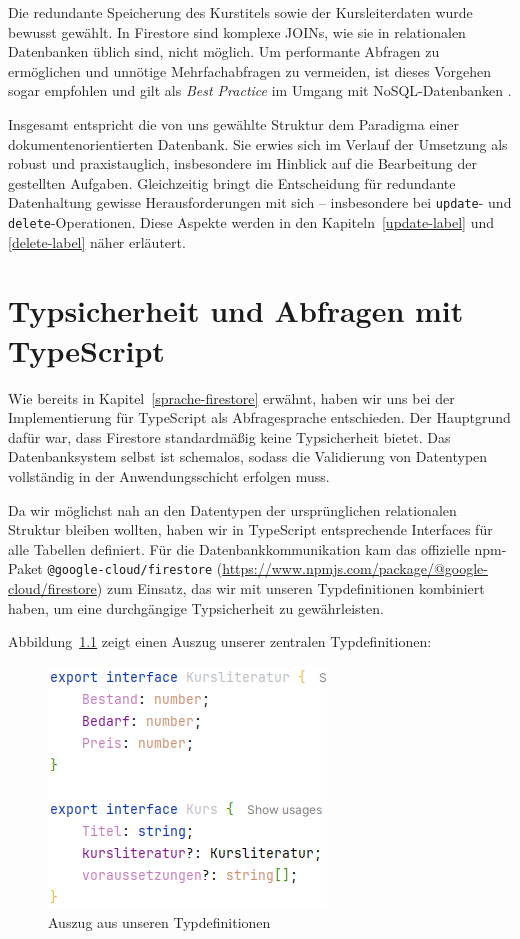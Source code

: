 \documentclass[12pt,a4paper%
              ,oneside     %
              ,titlepage
              ,DIV=13
              ,headinclude
              ,footinclude=false%
              ,cleardoublepage=empty%
              ,parskip=half,
              BCOR=0mm,
              ]{scrreprt}
\begin{document}
Die redundante Speicherung des Kurstitels sowie der Kursleiterdaten wurde bewusst gewählt. In Firestore sind komplexe JOINs, wie sie in relationalen Datenbanken üblich sind, nicht möglich. Um performante Abfragen zu ermöglichen und unnötige Mehrfachabfragen zu vermeiden, ist dieses Vorgehen sogar empfohlen und gilt als \textit{Best Practice} im Umgang mit NoSQL-Datenbanken \cite{Estuary.2025}.

Insgesamt entspricht die von uns gewählte Struktur dem Paradigma einer dokumentenorientierten Datenbank. Sie erwies sich im Verlauf der Umsetzung als robust und praxistauglich, insbesondere im Hinblick auf die Bearbeitung der gestellten Aufgaben. Gleichzeitig bringt die Entscheidung für redundante Datenhaltung gewisse Herausforderungen mit sich – insbesondere bei \texttt{update}- und \texttt{delete}-Operationen. Diese Aspekte werden in den Kapiteln~\ref{update-label} und \ref{delete-label} näher erläutert.

\chapter{Typsicherheit und Abfragen mit TypeScript}
\label{typ-sicherheit-chapter}

Wie bereits in Kapitel~\ref{sprache-firestore} erwähnt, haben wir uns bei der Implementierung für TypeScript als Abfragesprache entschieden. Der Hauptgrund dafür war, dass Firestore standardmäßig keine Typsicherheit bietet. Das Datenbanksystem selbst ist schemalos, sodass die Validierung von Datentypen vollständig in der Anwendungsschicht erfolgen muss.

Da wir möglichst nah an den Datentypen der ursprünglichen relationalen Struktur bleiben wollten, haben wir in TypeScript entsprechende Interfaces für alle Tabellen definiert. Für die Datenbankkommunikation kam das offizielle npm-Paket \texttt{@google-cloud/firestore} (\url{https://www.npmjs.com/package/@google-cloud/firestore}) zum Einsatz, das wir mit unseren Typdefinitionen kombiniert haben, um eine durchgängige Typsicherheit zu gewährleisten.

Abbildung~\ref{fig:types} zeigt einen Auszug unserer zentralen Typdefinitionen:

\begin{figure}[H]
	\centering
	\includegraphics{img/types.png}
	\caption{Auszug aus unseren Typdefinitionen}
	\label{fig:types}
\end{figure}
\end{document}
